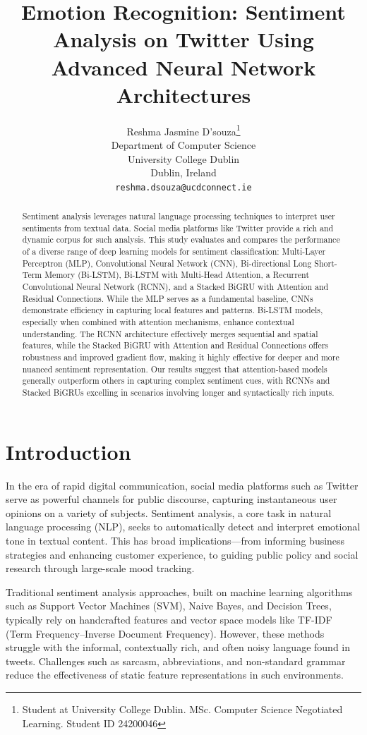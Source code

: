 \documentclass{article}
\title{Emotion Recognition: Sentiment Analysis on Twitter Using Advanced Neural Network Architectures}
\author{%
  Reshma Jasmine D'souza\thanks{Student at University College Dublin. MSc. Computer Science Negotiated Learning. Student ID 24200046} \\
  Department of Computer Science\\
  University College Dublin\\
  Dublin, Ireland \\
  \texttt{reshma.dsouza@ucdconnect.ie} \\
}
\begin{document}
\maketitle

\begin{abstract}
Sentiment analysis leverages natural language processing techniques to interpret user sentiments from textual data. Social media platforms like Twitter provide a rich and dynamic corpus for such analysis. This study evaluates and compares the performance of a diverse range of deep learning models for sentiment classification: Multi-Layer Perceptron (MLP), Convolutional Neural Network (CNN), Bi-directional Long Short-Term Memory (Bi-LSTM), Bi-LSTM with Multi-Head Attention, a Recurrent Convolutional Neural Network (RCNN), and a Stacked BiGRU with Attention and Residual Connections. While the MLP serves as a fundamental baseline, CNNs demonstrate efficiency in capturing local features and patterns. Bi-LSTM models, especially when combined with attention mechanisms, enhance contextual understanding. The RCNN architecture effectively merges sequential and spatial features, while the Stacked BiGRU with Attention and Residual Connections offers robustness and improved gradient flow, making it highly effective for deeper and more nuanced sentiment representation. Our results suggest that attention-based models generally outperform others in capturing complex sentiment cues, with RCNNs and Stacked BiGRUs excelling in scenarios involving longer and syntactically rich inputs.
\end{abstract}

\section{Introduction}

In the era of rapid digital communication, social media platforms such as Twitter serve as powerful channels for public discourse, capturing instantaneous user opinions on a variety of subjects. Sentiment analysis, a core task in natural language processing (NLP), seeks to automatically detect and interpret emotional tone in textual content. This has broad implications—from informing business strategies and enhancing customer experience, to guiding public policy and social research through large-scale mood tracking.

Traditional sentiment analysis approaches, built on machine learning algorithms such as Support Vector Machines (SVM), Naive Bayes, and Decision Trees, typically rely on handcrafted features and vector space models like TF-IDF (Term Frequency–Inverse Document Frequency). However, these methods struggle with the informal, contextually rich, and often noisy language found in tweets. Challenges such as sarcasm, abbreviations, and non-standard grammar reduce the effectiveness of static feature representations in such environments.
\end{document}
